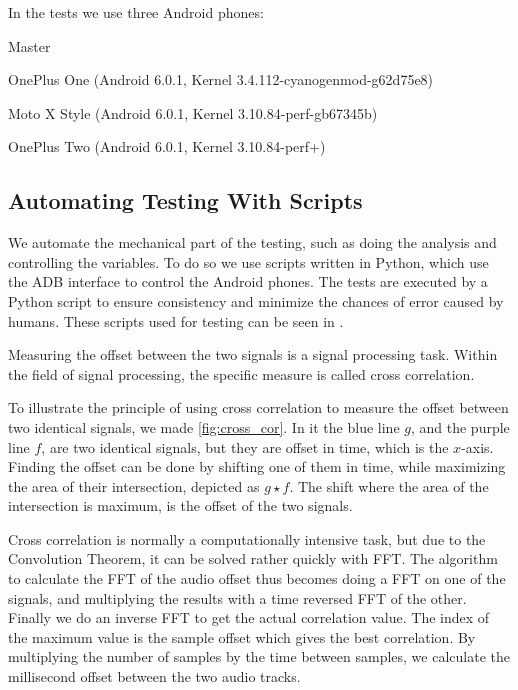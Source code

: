 In the tests we use three Android phones:
\begin{dankscription}{\bfseries}{Master}
	\item[Master]OnePlus One (Android 6.0.1, Kernel 3.4.112-cyanogenmod-g62d75e8)
	\item[Slave 1]Moto X Style (Android 6.0.1, Kernel 3.10.84-perf-gb67345b)
	\item[Slave 2]OnePlus Two (Android 6.0.1, Kernel 3.10.84-perf+)
\end{dankscription}

\subsection{Automating Testing With Scripts}
We automate the mechanical part of the testing, such as doing the
analysis and controlling the variables. To do so we use scripts written
in Python, which use the \ac{ADB} interface to control the Android
phones. The tests are executed by a Python script to ensure
consistency and minimize the chances of error caused by humans.
These scripts used for testing can be seen in .

Measuring the offset between the two signals is a signal processing
task. Within the field of signal processing, the specific measure is
called cross correlation.

To illustrate the principle of using cross correlation to measure the offset between two identical signals, we made \cref{fig:cross_cor}.
In it the blue line $g$, and the purple line $f$, are two identical signals, but they are offset in time, which is the $x$-axis.
Finding the offset can be done by shifting one of them in time, while maximizing the area of their intersection, depicted as $g \star f$.
The shift where the area of the intersection is maximum, is the offset of the two signals.

Cross correlation is normally
a computationally intensive task, but due to the Convolution
Theorem\cite{conv_theo}, it can be solved rather quickly with \ac{FFT}.
The algorithm to calculate the \ac{FFT} of the audio offset thus becomes
doing a \ac{FFT} on one of the signals, and multiplying the results with
a time reversed \ac{FFT} of the other. Finally we do an inverse \ac{FFT}
to get the actual correlation value. The index of the maximum value is
the sample offset which gives the best correlation.
By multiplying the
number of samples by the time between samples, we calculate the
millisecond offset between the two audio tracks.



